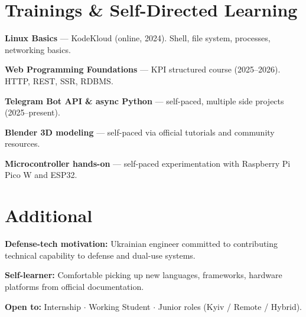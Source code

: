 \documentclass[letterpaper,11pt]{article}
\begin{document}
\section{Trainings \& Self-Directed Learning}
\begin{itemize}[leftmargin=0.15in, label={\small\textbullet}]
    \small{
      \item \textbf{Linux Basics} — KodeKloud (online, 2024). Shell, file system, processes, networking basics.
      \item \textbf{Web Programming Foundations} — KPI structured course (2025--2026). HTTP, REST, SSR, RDBMS.
      \item \textbf{Telegram Bot API \& async Python} — self-paced, multiple side projects (2025--present).
      \item \textbf{Blender 3D modeling} — self-paced via official tutorials and community resources.
      \item \textbf{Microcontroller hands-on} — self-paced experimentation with Raspberry Pi Pico W and ESP32.
    }
\end{itemize}
\vspace{-12pt}

\section{Additional}
\begin{itemize}[leftmargin=0.15in, label={\small\textbullet}]
    \small{
      \item \textbf{Defense-tech motivation:} Ukrainian engineer committed to contributing technical capability to defense and dual-use systems.
      \item \textbf{Self-learner:} Comfortable picking up new languages, frameworks, hardware platforms from official documentation.
      \item \textbf{Open to:} Internship $\cdot$ Working Student $\cdot$ Junior roles (Kyiv / Remote / Hybrid).
    }
\end{itemize}
\end{document}

